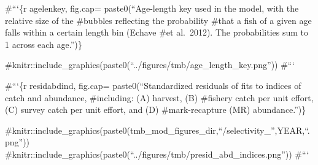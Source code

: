 \documentclass[
]{article}
\begin{document}
\#```\{r agelenkey, fig.cap= paste0(``Age-length key used in the model,
with the relative size of the \#bubbles reflecting the probability
\#that a fish of a given age falls within a certain length bin (Echave
\#et al.~2012). The probabilities sum to 1 across each age.'')\}

\#knitr::include\_graphics(paste0(``../figures/tmb/age\_length\_key.png''))
\#```

\#```\{r residabdind, fig.cap= paste0(``Standardized residuals of fits
to indices of catch and abundance, \#including: (A) harvest, (B)
\#fishery catch per unit effort, (C) survey catch per unit effort, and
(D) \#mark-recapture (MR) abundance.'')\}

\#knitr::include\_graphics(paste0(tmb\_mod\_figures\_dir,``/selectivity\_'',YEAR,``.png''))
\#knitr::include\_graphics(paste0(``../figures/tmb/presid\_abd\_indices.png''))
\#```
\end{document}
